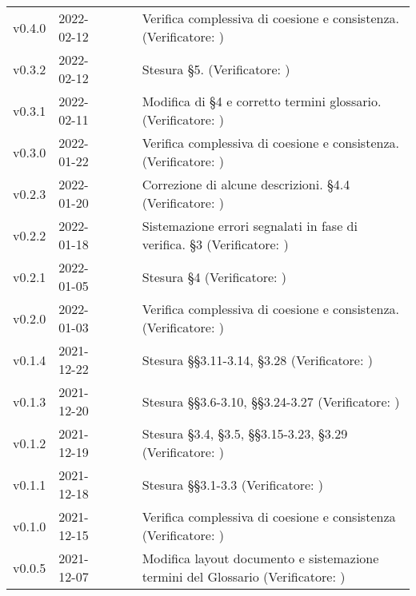 \begin{longtable}{ m{}<{\centering}  m{}<{\centering}  m{}<{\centering}  m{}<{\centering}  m{}<{\centering} }
	v0.4.0 & 2022-02-12 & \FP{} & \AN{} & Verifica complessiva di coesione e consistenza. (Verificatore: \textit{\MG})\\

	v0.3.2 & 2022-02-12 & \FP{} & \AN{} & Stesura §5. (Verificatore: \textit{\MG})\\

	v0.3.1 & 2022-02-11 & \GC{} & \AN{} & Modifica di \S{}4 e corretto termini glossario. (Verificatore: \textit{\MG})\\
	
	v0.3.0 & 2022-01-22 & \GC{} & \AN{} & Verifica complessiva di coesione e consistenza. (Verificatore: \textit{\MG})\\		
	
	v0.2.3 & 2022-01-20 & \GC{} & \AN{} & Correzione di alcune descrizioni. \S{}4.4 (Verificatore: \textit{\MG})\\

	v0.2.2 & 2022-01-18 & \GC & \AN & Sistemazione errori segnalati in fase di verifica. \S{}3 (Verificatore: \textit{\PV}) \\

	v0.2.1 & 2022-01-05 & \GC{} & \AN{} & Stesura §4 (Verificatore: \textit{\MG})\\	

	v0.2.0 & 2022-01-03 & \LW{} & \AN{} & Verifica complessiva di coesione e consistenza. (Verificatore: \textit{\PV})\\	

	v0.1.4 & 2021-12-22 & \LW{} & \AN{} & Stesura §§3.11-3.14, §3.28 (Verificatore: \textit{\PV})\\	

	v0.1.3 & 2021-12-20 & \FP{} & \AN{} & Stesura §§3.6-3.10, §§3.24-3.27 (Verificatore: \textit{\PV})\\	
	
	v0.1.2 & 2021-12-19 & \GC{} & \AN{} & Stesura §3.4, §3.5, §§3.15-3.23, §3.29 (Verificatore: \textit{\PV})\\	

	v0.1.1 & 2021-12-18 & \FP{} & \AN{} & Stesura §§3.1-3.3 (Verificatore: \textit{\PV})\\	

	v0.1.0 & 2021-12-15 & \FP{} & \AN{} & Verifica complessiva di coesione e consistenza (Verificatore: \textit{\PV})\\
	
	v0.0.5& 2021-12-07 & \GC{} & \AN{} & Modifica layout documento e sistemazione termini del Glossario (Verificatore: \textit{\PV{}})\\


\end{longtable}
